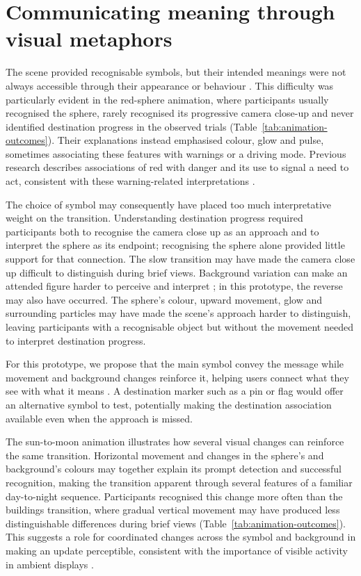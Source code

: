 \documentclass[
english,                 %
bibtex,                  %
includeExtraAbstracts, %
]{kththesis}
\numberwithin{listing}{chapter}
\begin{document}
\section{Communicating meaning through visual metaphors}
\label{sec:discussion-meaning}

The scene provided recognisable symbols, but their intended meanings were not always accessible through their appearance or behaviour \cite{ferschaInformativeArtDisplay2007}. This difficulty was particularly evident in the red-sphere animation, where participants usually recognised the sphere, rarely recognised its progressive camera close-up and never identified destination progress in the observed trials (Table~\ref{tab:animation-outcomes}). Their explanations instead emphasised colour, glow and pulse, sometimes associating these features with warnings or a driving mode. Previous research describes associations of red with danger and its use to signal a need to act, consistent with these warning-related interpretations \cite{ferschaMatterTaste2007,matviienkoNewAmbientLight2015}.

The choice of symbol may consequently have placed too much interpretative weight on the transition. Understanding destination progress required participants both to recognise the camera close up as an approach and to interpret the sphere as its endpoint; recognising the sphere alone provided little support for that connection. The slow transition may have made the camera close up difficult to distinguish during brief views. Background variation can make an attended figure harder to perceive and interpret \cite{ferschaMatterTaste2007}; in this prototype, the reverse may also have occurred. The sphere's colour, upward movement, glow and surrounding particles may have made the scene's approach harder to distinguish, leaving participants with a recognisable object but without the movement needed to interpret destination progress.

For this prototype, we propose that the main symbol convey the message while movement and background changes reinforce it, helping users connect what they see with what it means \cite{ferschaMatterTaste2007}. A destination marker such as a pin or flag would offer an alternative symbol to test, potentially making the destination association available even when the approach is missed.

The sun-to-moon animation illustrates how several visual changes can reinforce the same transition. Horizontal movement and changes in the sphere's and background's colours may together explain its prompt detection and successful recognition, making the transition apparent through several features of a familiar day-to-night sequence. Participants recognised this change more often than the buildings transition, where gradual vertical movement may have produced less distinguishable differences during brief views (Table~\ref{tab:animation-outcomes}). This suggests a role for coordinated changes across the symbol and background in making an update perceptible, consistent with the importance of visible activity in ambient displays \cite{skogAestheticsUtilityDesigning2003}.
\end{document}
